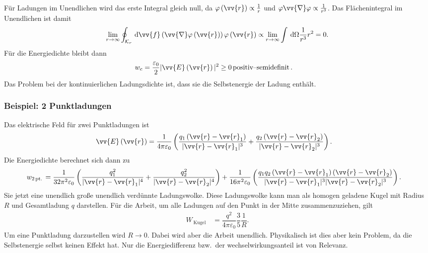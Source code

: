 \documentclass[a4paper,12pt]{article}
\newcommand{\td}{\,\text{d}}
\numberwithin{equation}{section}
\begin{document}
Für Ladungen im Unendlichen wird das erste Integral gleich null, da $\varphi \left(\vv{r}\right)\propto\tfrac{1}{r}$ und $\varphi \vv{\nabla }\varphi \propto \tfrac{1}{r^3}$. Das Flächenintegral im Unendlichen ist damit
\begin{align} 
        \lim_{r\rightarrow \infty}\oint_{\mathcal{K}_r}^{}\td \vv{f}\left(\vv{\nabla }\varphi \left(\vv{r}\right)\right)\varphi \left(\vv{r}\right)\propto \lim_{r\rightarrow \infty}\int_{}^{}\td \Omega \dfrac{1}{r^3}r^2=0
.\end{align} 
Für die Energiedichte bleibt dann
\begin{align} 
        w_c&=\dfrac{\varepsilon _0}{2}|\vv{E}\left(\vv{r}\right)|^2\geq 0\,\text{positiv--semidefinit}\,
.\end{align} 
Das Problem bei der kontinuierlichen Ladungsdichte ist, dass sie die Selbstenergie der Ladung enthält.

\subsubsection{Beispiel: 2 Punktladungen}
Das elektrische Feld für zwei Punktladungen ist
\begin{align} 
        \vv{E}\left(\vv{r}\right)&=\dfrac{1}{4\pi \varepsilon _0}\left(\dfrac{q_1\left(\vv{r}-\vv{r}_1\right)}{|\vv{r}-\vv{r}_1|^3}+\dfrac{q_2\left(\vv{r}-\vv{r}_2\right)}{|\vv{r}-\vv{r}_2|^3}\right)
.\end{align} 
Die Energiedichte berechnet sich dann zu
\begin{align} 
        w_{2\,\text{pt.}\,}&=\dfrac{1}{32\pi ^2\varepsilon _0}\left(\dfrac{q_1^2}{|\vv{r}-\vv{r}_1|^4}+\dfrac{q_2^2}{|\vv{r}-\vv{r}_2|^4}\right)+\dfrac{1}{16\pi ^2\varepsilon _0}\left(\dfrac{q_1q_2\left(\vv{r}-\vv{r}_1\right)\left(\vv{r}-\vv{r}_2\right)}{|\vv{r}-\vv{r}_1|^3|\vv{r}-\vv{r}_2|^3}\right)
.\end{align} 
Sie jetzt eine unendlich große unendlich verdünnte Ladungswolke. Diese Ladungswolke kann man als homogen geladene Kugel mit Radius $R$ und Gesamtladung $q$ darstellen. Für die Arbeit, um alle Ladungen auf den Punkt in der Mitte zusammenzuziehen, gilt
\begin{align} 
        W_{\,\text{Kugel}\,}&=\dfrac{q^2}{4\pi \varepsilon _0}\dfrac{3}{5}\dfrac{1}{R}
.\end{align} 
Um eine Punktladung darzustellen wird $R\rightarrow 0$. Dabei wird aber die Arbeit unendlich. Physikalisch ist dies aber kein Problem, da die Selbstenergie selbst keinen Effekt hat. Nur die Energiedifferenz bzw.\ der wechselwirkungsanteil ist von Relevanz.
\end{document}
